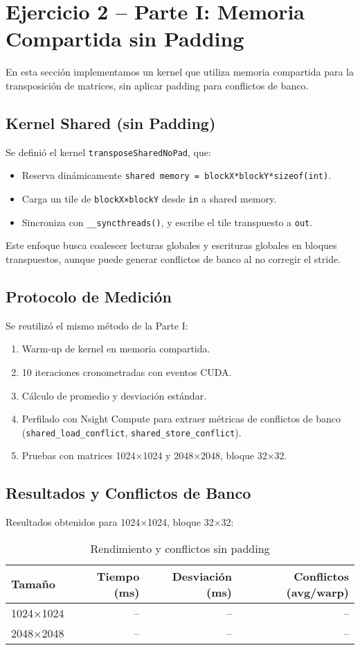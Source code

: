 \documentclass[a4paper,11pt]{article}
\begin{document}
\section{Ejercicio 2 – Parte I: Memoria Compartida sin Padding}
En esta sección implementamos un kernel que utiliza memoria compartida para la transposición de matrices, sin aplicar padding para conflictos de banco.

\subsection{Kernel Shared (sin Padding)}
Se definió el kernel \texttt{transposeSharedNoPad}, que:
\begin{itemize}[noitemsep]
  \item Reserva dinámicamente \texttt{shared memory = blockX*blockY*sizeof(int)}.
  \item Carga un tile de \texttt{blockX×blockY} desde \texttt{in} a shared memory.
  \item Sincroniza con \texttt{__syncthreads()}, y escribe el tile transpuesto a \texttt{out}.
\end{itemize}
Este enfoque busca coalescer lecturas globales y escrituras globales en bloques transpuestos, aunque puede generar conflictos de banco al no corregir el stride.

\subsection{Protocolo de Medición}
Se reutilizó el mismo método de la Parte I:
\begin{enumerate}[noitemsep]
  \item Warm-up de kernel en memoria compartida.
  \item 10 iteraciones cronometradas con eventos CUDA.
  \item Cálculo de promedio y desviación estándar.
  \item Perfilado con Nsight Compute para extraer métricas de conflictos de banco (\texttt{shared_load_conflict}, \texttt{shared_store_conflict}).
  \item Pruebas con matrices 1024×1024 y 2048×2048, bloque 32×32.
\end{enumerate}

\subsection{Resultados y Conflictos de Banco}
Resultados obtenidos para 1024×1024, bloque 32×32:
\begin{table}[H]
\centering
\caption{Rendimiento y conflictos sin padding}
\begin{tabular}{lrrr}
\toprule
Tamaño & Tiempo (ms) & Desviación (ms) & Conflictos (avg/warp) \\
\midrule
1024×1024 & -- & -- & -- \\
2048×2048 & -- & -- & -- \\
\bottomrule
\end{tabular}
\end{table}
\end{document}
